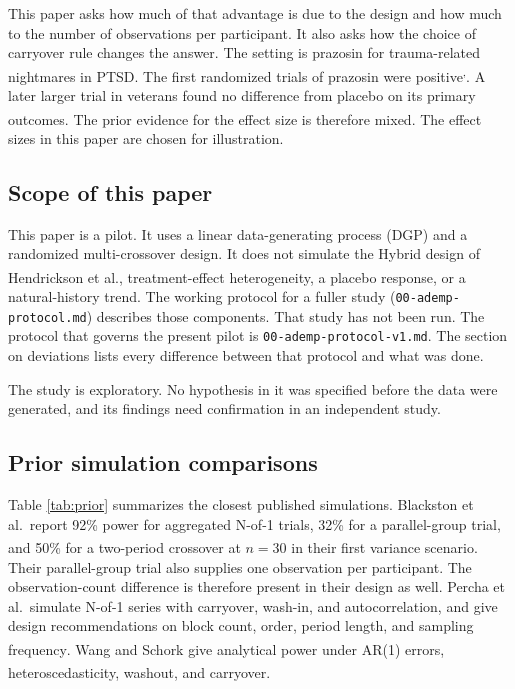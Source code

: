 \documentclass[
  11pt,
]{article}
\begin{document}
This paper asks how much of that advantage is due to the design and how much to the number of observations per participant. It also asks how the choice of carryover rule changes the answer. The setting is prazosin for trauma-related nightmares in PTSD. The first randomized trials of prazosin were positive\textsuperscript{,}. A later larger trial in veterans found no difference from placebo on its primary outcomes\textsuperscript{}. The prior evidence for the effect size is therefore mixed. The effect sizes in this paper are chosen for illustration.

\subsection{Scope of this paper}\label{scope-of-this-paper}

This paper is a pilot. It uses a linear data-generating process (DGP) and a randomized multi-crossover design. It does not simulate the Hybrid design of Hendrickson et al.\textsuperscript{}, treatment-effect heterogeneity, a placebo response, or a natural-history trend. The working protocol for a fuller study (\texttt{00-ademp-protocol.md}) describes those components. That study has not been run. The protocol that governs the present pilot is \texttt{00-ademp-protocol-v1.md}. The section on deviations lists every difference between that protocol and what was done.

The study is exploratory. No hypothesis in it was specified before the data were generated, and its findings need confirmation in an independent study.

\subsection{Prior simulation comparisons}\label{prior-simulation-comparisons}

Table \ref{tab:prior} summarizes the closest published simulations. Blackston et al.~report 92\% power for aggregated N-of-1 trials, 32\% for a parallel-group trial, and 50\% for a two-period crossover at \(n = 30\) in their first variance scenario\textsuperscript{}. Their parallel-group trial also supplies one observation per participant. The observation-count difference is therefore present in their design as well. Percha et al.~simulate N-of-1 series with carryover, wash-in, and autocorrelation, and give design recommendations on block count, order, period length, and sampling frequency\textsuperscript{}. Wang and Schork give analytical power under AR(1) errors, heteroscedasticity, washout, and carryover\textsuperscript{}.
\end{document}
